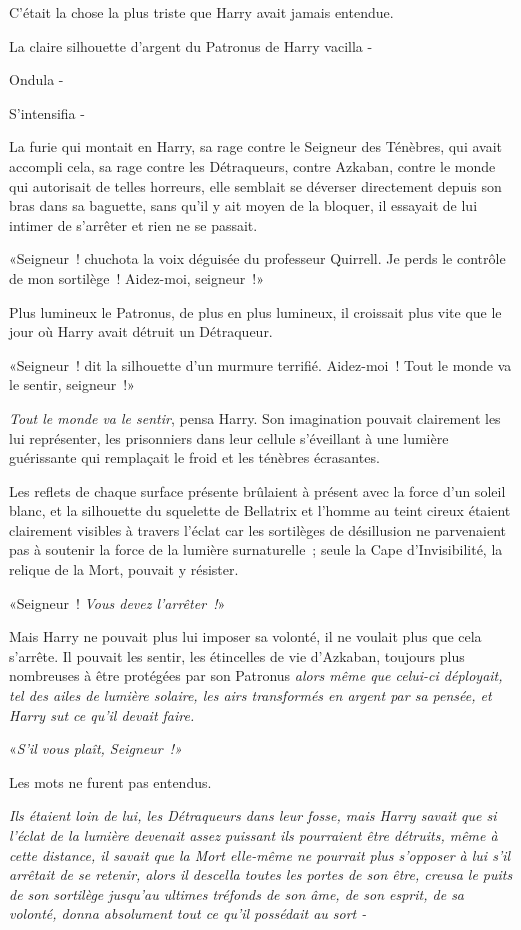 C'était la chose la plus triste que Harry avait jamais entendue.

La claire silhouette d'argent du Patronus de Harry vacilla -

Ondula -

S'intensifia -

La furie qui montait en Harry, sa rage contre le Seigneur des Ténèbres, qui avait accompli cela, sa rage contre les Détraqueurs, contre Azkaban, contre le monde qui autorisait de telles horreurs, elle semblait se déverser directement depuis son bras dans sa baguette, sans qu'il y ait moyen de la bloquer, il essayait de lui intimer de s'arrêter et rien ne se passait.

«Seigneur~! chuchota la voix déguisée du professeur Quirrell. Je perds le contrôle de mon sortilège~! Aidez-moi, seigneur~!»

Plus lumineux le Patronus, de plus en plus lumineux, il croissait plus vite que le jour où Harry avait détruit un Détraqueur.

«Seigneur~! dit la silhouette d'un murmure terrifié. Aidez-moi~! Tout le monde va le sentir, seigneur~!»

\emph{Tout le monde va le sentir}, pensa Harry. Son imagination pouvait clairement les lui représenter, les prisonniers dans leur cellule s'éveillant à une lumière guérissante qui remplaçait le froid et les ténèbres écrasantes.

Les reflets de chaque surface présente brûlaient à présent avec la force d'un soleil blanc, et la silhouette du squelette de Bellatrix et l'homme au teint cireux étaient clairement visibles à travers l'éclat car les sortilèges de désillusion ne parvenaient pas à soutenir la force de la lumière surnaturelle~; seule la Cape d'Invisibilité, la relique de la Mort, pouvait y résister.

«Seigneur~! \emph{Vous devez l'arrêter~!}»

Mais Harry ne pouvait plus lui imposer sa volonté, il ne voulait plus que cela s'arrête. Il pouvait les sentir, les étincelles de vie d'Azkaban, toujours plus nombreuses à être protégées par son Patronus \emph{alors même que celui-ci déployait, tel des ailes de lumière solaire, les airs transformés en argent par sa pensée, et Harry sut ce qu'il devait faire.}

«\emph{S'il vous plaît, Seigneur~!»}

Les mots ne furent pas entendus.

\emph{Ils étaient loin de lui, les Détraqueurs dans leur fosse, mais Harry savait que si l'éclat de la lumière devenait assez puissant ils pourraient être détruits, même à cette distance, il savait que la Mort elle-même ne pourrait plus s'opposer à lui s'il arrêtait de se retenir, alors il descella toutes les portes de son être, creusa le puits de son sortilège jusqu'au ultimes tréfonds de son âme, de son esprit, de sa volonté, donna absolument tout ce qu'il possédait au sort -}


